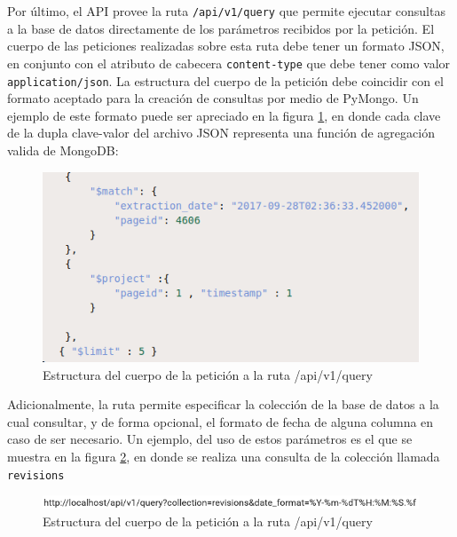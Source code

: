 

Por último, el API provee la ruta \texttt{/api/v1/query} que permite ejecutar consultas a la base de datos directamente de los parámetros recibidos por la petición.
El cuerpo de las peticiones realizadas sobre esta ruta debe tener un formato JSON, en conjunto con el atributo de cabecera
\texttt{content-type} que debe tener como valor \texttt{application/json}.
La estructura del cuerpo de la petición debe coincidir con el formato aceptado para la creación de consultas por medio de PyMongo.
Un ejemplo de este formato puede ser apreciado en la figura \ref{fig:query_body_format}, en donde cada clave de la dupla clave-valor del archivo JSON representa una función de agregación valida de MongoDB:

\begin{figure}[H]
	\centering
		\includegraphics[width=1\textwidth]{figures/query_body_format}
	\caption{Estructura del cuerpo de la petición a la ruta /api/v1/query}
	\label{fig:query_body_format}
\end{figure}

Adicionalmente, la ruta permite especificar la colección de la base de datos a la cual consultar, y de forma opcional,
el formato de fecha de alguna columna en caso de ser necesario.
Un ejemplo, del uso de estos parámetros es el que se muestra en la figura \ref{fig:query_url}, en donde se realiza una consulta de la colección llamada \texttt{revisions}

\begin{figure}[H]
	\centering
		\includegraphics[width=1\textwidth]{figures/query_url}
	\caption{Estructura del cuerpo de la petición a la ruta /api/v1/query}
	\label{fig:query_url}
\end{figure}

